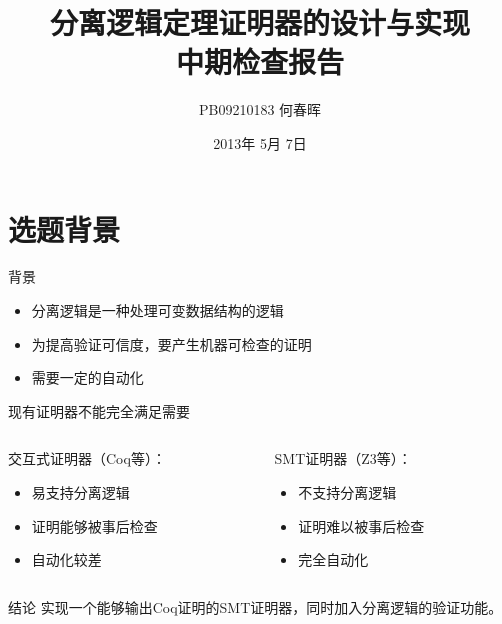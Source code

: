 \documentclass{beamer}
\title{分离逻辑定理证明器的设计与实现 \\ 中期检查报告}
\author{PB09210183 何春晖}
\date{2013年 5月 7日}
\begin{document}
\frame{\titlepage}

\section{选题背景}
\begin{frame}[fragile]
  \begin{block}{背景}
    \begin{itemize}
    \item 分离逻辑是一种处理可变数据结构的逻辑
    \item 为提高验证可信度，要产生机器可检查的证明
    \item 需要一定的自动化
    \end{itemize}
  \end{block}
  \pause
  \begin{block}{现有证明器不能完全满足需要}
    \begin{columns}
      \begin{column}{0.45\textwidth}
        交互式证明器（Coq等）：
        \begin{itemize}
        \item 易支持分离逻辑
        \item 证明能够被事后检查
        \item 自动化较差
        \end{itemize}
      \end{column}
      \begin{column}{0.45\textwidth}
        SMT证明器（Z3等）：
        \begin{itemize}
        \item 不支持分离逻辑
        \item 证明难以被事后检查
        \item 完全自动化
        \end{itemize}
      \end{column}
    \end{columns}
  \end{block}
  \pause
  \begin{block}{结论}
    实现一个{\color{red}能够输出Coq证明}的SMT证明器，同时{\color{red}加入分离逻辑的验证}功能。
  \end{block}
\end{frame}
\end{document}
